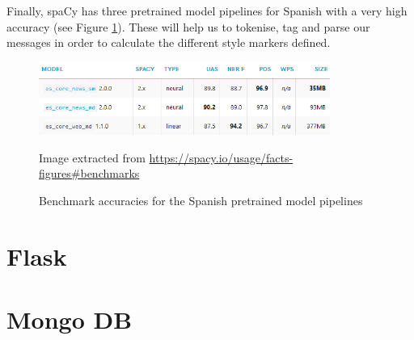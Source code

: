 Finally, spaCy has three pretrained model pipelines for Spanish with a very high accuracy (see Figure \ref{fig:spacymodel}). These will help us to tokenise, tag and parse our messages in order to calculate the different style markers defined.

\begin{figure}[h]
	\centering%
	\includegraphics[width = 0.85\textwidth]{Imagenes/Bitmap/Spacy/spacymodel.png}%
	\caption{Benchmark accuracies for the Spanish pretrained model pipelines}%
	Image extracted from \url{https://spacy.io/usage/facts-figures#benchmarks}
	\label{fig:spacymodel}
\end{figure}

\section{Flask}\label{sect:flask}

\section{Mongo DB}\label{sect:mongo}